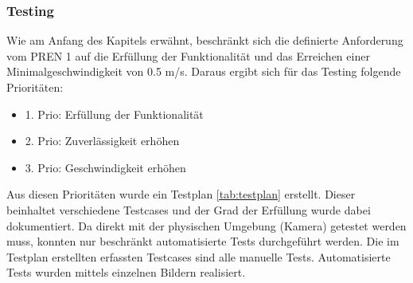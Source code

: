 \documentclass[../../main.tex]{subfiles}
\begin{document}
\subsubsection{Testing}
Wie am Anfang des Kapitels erwähnt, beschränkt sich die definierte Anforderung vom PREN 1 auf die Erfüllung der Funktionalität und das Erreichen einer Minimalgeschwindigkeit von 0.5 m/s. Daraus ergibt sich für das Testing folgende Prioritäten:
\begin{itemize}
  \item 1. Prio: Erfüllung der Funktionalität
  \item 2. Prio: Zuverlässigkeit erhöhen
  \item 3. Prio: Geschwindigkeit erhöhen
\end{itemize}

Aus diesen Prioritäten wurde ein Testplan \ref{tab:testplan} erstellt. Dieser beinhaltet verschiedene Testcases und der Grad der Erfüllung wurde dabei dokumentiert. Da direkt mit der physischen Umgebung (Kamera) getestet werden muss, konnten nur beschränkt automatisierte Tests durchgeführt werden. Die im Testplan erstellten erfassten Testcases sind alle manuelle Tests. Automatisierte Tests wurden mittels einzelnen Bildern realisiert.

\newpage
\end{document}
